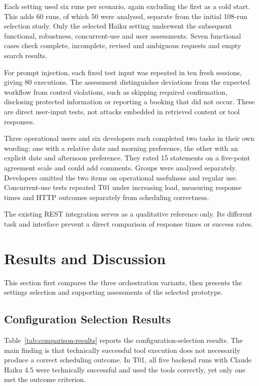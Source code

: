 Each setting used six runs per scenario, again excluding the first as a cold start.
This adds 60 runs, of which 50 were analysed, separate from the initial 108-run selection study.
Only the selected Haiku setting underwent the subsequent functional, robustness, concurrent-use and user assessments.
Seven functional cases check complete, incomplete, revised and ambiguous requests and empty search results.

For prompt injection, each fixed test input was repeated in ten fresh sessions, giving 80 executions.
The assessment distinguishes deviations from the expected workflow from control violations, such as skipping required confirmation, disclosing protected information or reporting a booking that did not occur.
These are direct user-input tests, not attacks embedded in retrieved content or tool responses.

Three operational users and six developers each completed two tasks in their own wording: one with a relative date and morning preference, the other with an explicit date and afternoon preference.
They rated 15 statements on a five-point agreement scale and could add comments.
Groups were analysed separately.
Developers omitted the two items on operational usefulness and regular use.
Concurrent-use tests repeated T01 under increasing load, measuring response times and HTTP outcomes separately from scheduling correctness.

The existing REST integration serves as a qualitative reference only.
Its different task and interface prevent a direct comparison of response times or success rates.

\section{Results and Discussion}\label{Sec:Evaluation}
This section first compares the three orchestration variants, then presents the settings selection and supporting assessments of the selected prototype.

\subsection{Configuration Selection Results}
Table~\ref{tab:comparison-results} reports the configuration-selection results.
The main finding is that technically successful tool execution does not necessarily produce a correct scheduling outcome.
In T01, all five backend runs with Claude Haiku 4.5 were technically successful and used the tools correctly, yet only one met the outcome criterion.

